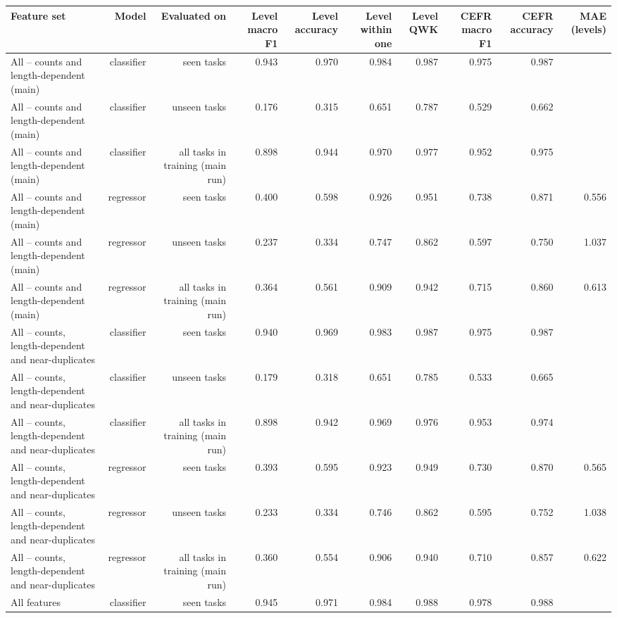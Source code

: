 \begin{table}[t]
\centering
\small
\begin{tabular}{lrrrrrrrrr}
\toprule
Feature set & Model & Evaluated on & Level macro F1 & Level accuracy & Level within one & Level QWK & CEFR macro F1 & CEFR accuracy & MAE (levels) \\
\midrule
All -- counts and length-dependent (main) & classifier & seen tasks & 0.943 & 0.970 & 0.984 & 0.987 & 0.975 & 0.987 &  \\
All -- counts and length-dependent (main) & classifier & unseen tasks & 0.176 & 0.315 & 0.651 & 0.787 & 0.529 & 0.662 &  \\
All -- counts and length-dependent (main) & classifier & all tasks in training (main run) & 0.898 & 0.944 & 0.970 & 0.977 & 0.952 & 0.975 &  \\
All -- counts and length-dependent (main) & regressor & seen tasks & 0.400 & 0.598 & 0.926 & 0.951 & 0.738 & 0.871 & 0.556 \\
All -- counts and length-dependent (main) & regressor & unseen tasks & 0.237 & 0.334 & 0.747 & 0.862 & 0.597 & 0.750 & 1.037 \\
All -- counts and length-dependent (main) & regressor & all tasks in training (main run) & 0.364 & 0.561 & 0.909 & 0.942 & 0.715 & 0.860 & 0.613 \\
All -- counts, length-dependent and near-duplicates & classifier & seen tasks & 0.940 & 0.969 & 0.983 & 0.987 & 0.975 & 0.987 &  \\
All -- counts, length-dependent and near-duplicates & classifier & unseen tasks & 0.179 & 0.318 & 0.651 & 0.785 & 0.533 & 0.665 &  \\
All -- counts, length-dependent and near-duplicates & classifier & all tasks in training (main run) & 0.898 & 0.942 & 0.969 & 0.976 & 0.953 & 0.974 &  \\
All -- counts, length-dependent and near-duplicates & regressor & seen tasks & 0.393 & 0.595 & 0.923 & 0.949 & 0.730 & 0.870 & 0.565 \\
All -- counts, length-dependent and near-duplicates & regressor & unseen tasks & 0.233 & 0.334 & 0.746 & 0.862 & 0.595 & 0.752 & 1.038 \\
All -- counts, length-dependent and near-duplicates & regressor & all tasks in training (main run) & 0.360 & 0.554 & 0.906 & 0.940 & 0.710 & 0.857 & 0.622 \\
All features & classifier & seen tasks & 0.945 & 0.971 & 0.984 & 0.988 & 0.978 & 0.988 &  \\

\end{tabular}
\end{table}
